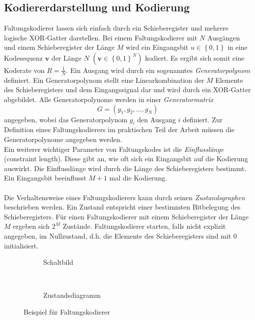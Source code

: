 \subsection{Kodiererdarstellung und Kodierung}
\label{kapitel:grundlagen_darstellung}
Faltungskodierer lassen sich einfach durch ein Schieberegister und mehrere logische XOR-Gatter darstellen. Bei einem Faltungskodierer mit $N$ Ausgängen und einem Schieberegister der Länge $M$ wird ein Eingangsbit $u \in \left\lbrace 0,1 \right\rbrace$ in eine Kodesequenz $\mathbf{v}$ der Länge $N$ $\left( \mathbf{v} \in {\left\lbrace 0,1\right\rbrace }^{N}\right)$ kodiert. Es ergibt sich somit eine Koderate von $R=\frac{1}{N}$. Ein Ausgang wird durch ein sogenanntes \emph{Generatorpolynom} definiert. Ein Generatorpolynom stellt eine Linearkombination der $M$ Elemente des Schieberegisters und dem Eingangssignal dar und wird durch ein XOR-Gatter abgebildet. Alle Generatorpolynome werden in einer \emph{Generatormatrix}
\begin{equation}
G=\left( g_{1}, g_{2},\dots , g_{N} \right) 
\end{equation}
angegeben, wobei das Generatorpolynom $g_{i}$ den Ausgang $i$ definiert. Zur Definition eines Faltungskodierers im praktischen Teil der Arbeit müssen die Generatorpolynome angegeben werden.
\\
Ein weiterer wichtiger Parameter von Faltungskodes ist die \emph{Einflusslänge} (constraint length). Diese gibt an, wie oft sich ein Eingangsbit auf die Kodierung auswirkt. Die Einflusslänge wird durch die Länge des Schieberegisters bestimmt. Ein Eingangsbit beeinflusst $M+1$ mal die Kodierung.
\\
\\
Die Verhaltensweise eines Faltungskodierers kann durch seinen \emph{Zustandsgraphen} beschrieben werden. Ein Zustand entspricht einer bestimmten Bitbelegung des Schieberegisters. Für einen Faltungskodierer mit einem Schieberegister der Länge $M$ ergeben sich $2^{M}$ Zustände. Faltungskodierer starten, falls nicht explizit angegeben, im Nullzustand, d.h. die Elemente des Schieberegisters sind mit 0 initialisiert.
\begin{figure}[t]
	\centering
	\begin{subfigure}{0.65\textwidth}
		\centering
		\resizebox{0.99\textwidth}{!}{%
			
		}
		\caption{Schaltbild}
		\label{abb:bsp1_schaltbild}
	\end{subfigure}
	~ %
	\begin{subfigure}{0.3\textwidth}
		\centering
		\resizebox{0.99\textwidth}{!}{%
			
		}
		\caption{Zustandsdiagramm}
		\label{abb:bsp1_zustandsdiagramm}
	\end{subfigure}
	\caption{Beispiel für Faltungskodierer}
	\label{abb:standardkodierer}
\end{figure}
